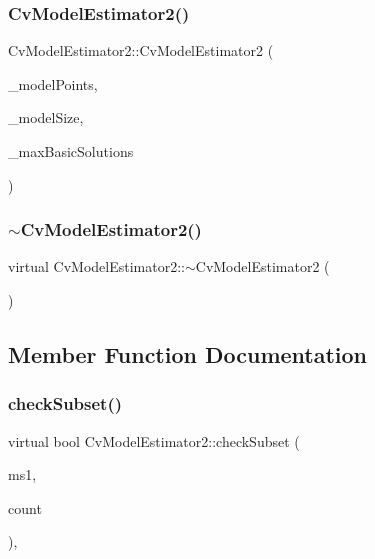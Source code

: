 \subsubsection{\texorpdfstring{Cv\+Model\+Estimator2()}{CvModelEstimator2()}}
{\footnotesize\ttfamily Cv\+Model\+Estimator2\+::\+Cv\+Model\+Estimator2 (\begin{DoxyParamCaption}\item[{int}]{\+\_\+model\+Points,  }\item[{Cv\+Size}]{\+\_\+model\+Size,  }\item[{int}]{\+\_\+max\+Basic\+Solutions }\end{DoxyParamCaption})}

\mbox{\label{class_cv_model_estimator2_a656e12f072058449ca45d785c0eaa02a}} 
\subsubsection{\texorpdfstring{$\sim$\+Cv\+Model\+Estimator2()}{~CvModelEstimator2()}}
{\footnotesize\ttfamily virtual Cv\+Model\+Estimator2\+::$\sim$\+Cv\+Model\+Estimator2 (\begin{DoxyParamCaption}{ }\end{DoxyParamCaption})\hspace{0.3cm}{\ttfamily [virtual]}}



\subsection{Member Function Documentation}
\mbox{\label{class_cv_model_estimator2_ae149bd480d9b445c66b1c34a351cbb5a}} 
\subsubsection{\texorpdfstring{check\+Subset()}{checkSubset()}}
{\footnotesize\ttfamily virtual bool Cv\+Model\+Estimator2\+::check\+Subset (\begin{DoxyParamCaption}\item[{const Cv\+Mat $\ast$}]{ms1,  }\item[{int}]{count }\end{DoxyParamCaption})\hspace{0.3cm}{\ttfamily [protected]}, {\ttfamily [virtual]}}

